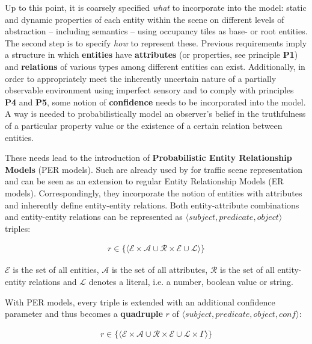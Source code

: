 Up to this point, it is coarsely specified \textit{what} to incorporate into the model: static and dynamic properties of each entity within the scene on different levels of abstraction – including semantics – using occupancy tiles as base- or root entities. The second step is to specify \textit{how} to represent these. Previous requirements imply a structure in which \textbf{entities} have \textbf{attributes} (or properties, see principle \textbf{P1}) and \textbf{relations} of various types among different entities can exist. Additionally, in order to appropriately meet the inherently uncertain nature of a partially observable environment using imperfect sensory and to comply with principles \textbf{P4} and \textbf{P5}, some notion of \textbf{confidence} needs to be incorporated into the model. A way is needed to probabilistically model an observer's belief in the truthfulness of a particular property value or the existence of a certain relation between entities. 

These needs lead to the introduction of \textbf{Probabilistic Entity Relationship Models} (PER models). Such are already used by \cite{Petrich2018} for traffic scene representation and can be seen as an extension to regular Entity Relationship Models (ER models). Correspondingly, they incorporate the notion of entities with attributes and inherently define entity-entity relations. Both entity-attribute combinations and entity-entity relations can be represented as $\langle subject, predicate, object \rangle$ triples:

\begin{gather}
	r \in \{ \langle \mathcal{E} \times \mathcal{A} \cup \mathcal{R} \times \mathcal{E} \cup \mathcal{L} \rangle \}
\end{gather}
\label{eq:triples}

$\mathcal{E}$ is the set of all entities, $\mathcal{A}$ is the set of all attributes, $\mathcal{R}$ is the set of all entity-entity relations and $\mathcal{L}$ denotes a literal, i.e. a number, boolean value or string.

With PER models, every triple is extended with an additional confidence parameter and thus becomes a \textbf{quadruple} $r$ of $\langle subject, predicate, object, \textit{conf} \rangle$: 

\begin{gather}
	r \in \{ \langle \mathcal{E} \times \mathcal{A} \cup \mathcal{R} \times \mathcal{E} \cup \mathcal{L} \times \Gamma \rangle \}
\end{gather}
\label{eq:quadruples}

